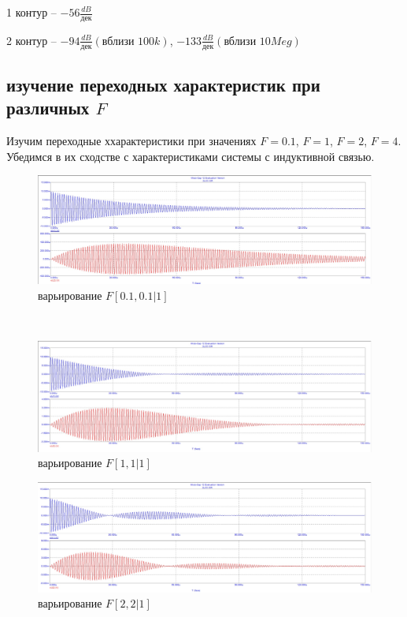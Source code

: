 \documentclass[a4paper, 14pt]{extarticle}%
\begin{document}
1 контур -- $-56\frac{dB}{\text{дек}}$

2 контур -- $-94\frac{dB}{\text{дек}}(\text{вблизи $100k$})$, $-133\frac{dB}{\text{дек}}(\text{вблизи $10Meg$})$



\subsection{изучение переходных характеристик при различных $F$}

Изучим  переходные ххарактеристики при значениях $F = 0.1$,  $F = 1$,  $F = 2$,   $F = 4$. Убедимся в их сходстве с характеристиками системы с индуктивной связью. 

\begin{figure}[h!]
	\centering
			\includegraphics[width=1.1\linewidth]{2.3_varF1.jpg}
            \caption{варьирование $F  [0.1, 0.1|1]$}
	\label{A}
\end{figure}

\newpage

$ $

\begin{figure}[h]
	\centering
			\includegraphics[width=1.1\linewidth]{2.3_varF2.jpg}
            \caption{варьирование $F  [1, 1|1]$}
	\label{A}
\end{figure}

\begin{figure}[h]
	\centering
			\includegraphics[width=1.1\linewidth]{2.3_varF3.jpg}
            \caption{варьирование $F   [2, 2|1]$}
	\label{A}
\end{figure}
\end{document}
